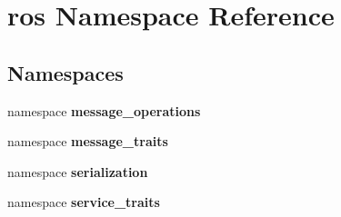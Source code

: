 \section{ros \-Namespace \-Reference}
\label{namespaceros}
\subsection*{\-Namespaces}
\begin{DoxyCompactItemize}
\item 
namespace {\bf message\-\_\-operations}
\item 
namespace {\bf message\-\_\-traits}
\item 
namespace {\bf serialization}
\item 
namespace {\bf service\-\_\-traits}
\end{DoxyCompactItemize}

